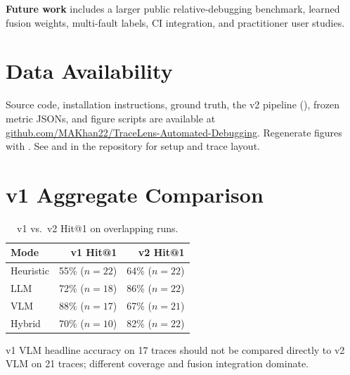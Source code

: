 \documentclass[sigconf,nonacm]{acmart}
\newcommand{\repoURL}{https://github.com/MAKhan22/TraceLens-Automated-Debugging}
\newcommand{\repoLink}{\href{\repoURL}{github.com/MAKhan22/TraceLens-Automated-Debugging}}
\begin{document}
\textbf{Future work} includes a larger public relative-debugging benchmark, learned fusion weights, multi-fault labels, CI integration, and practitioner user studies.

\section*{Data Availability}
\label{sec:data}

Source code, installation instructions, ground truth, the v2 pipeline (), frozen metric JSONs, and figure scripts are available at \repoLink.
Regenerate figures with .
See  and  in the repository for setup and trace layout.

\appendix
\section{v1 Aggregate Comparison}
\label{app:v1}

\begin{table}[h]
  \caption{v1 vs.\ v2 Hit@1 on overlapping runs.}
  \label{tab:v1v2}
  \small
  \begin{tabular}{lrr}
    \toprule
    Mode & v1 Hit@1 & v2 Hit@1 \\
    \midrule
    Heuristic & 55\% ($n{=}22$) & 64\% ($n{=}22$) \\
    LLM & 72\% ($n{=}18$) & 86\% ($n{=}22$) \\
    VLM & 88\% ($n{=}17$) & 67\% ($n{=}21$) \\
    Hybrid & 70\% ($n{=}10$) & 82\% ($n{=}22$) \\
    \bottomrule
  \end{tabular}
\end{table}

v1 VLM headline accuracy on 17 traces should not be compared directly to v2 VLM on 21 traces; different coverage and fusion integration dominate.



\end{document}

